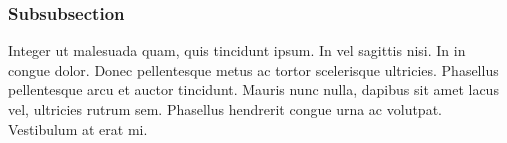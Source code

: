 \subsubsection{Subsubsection}
Integer ut malesuada quam, quis tincidunt ipsum. In vel sagittis nisi. In in congue dolor. Donec pellentesque metus ac tortor scelerisque ultricies. Phasellus pellentesque arcu et auctor tincidunt. Mauris nunc nulla, dapibus sit amet lacus vel, ultricies rutrum sem. Phasellus hendrerit congue urna ac volutpat. Vestibulum at erat mi.